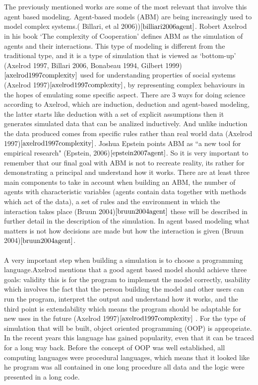 \documentclass{article}
\begin{document}
\\\\The previously mentioned works are some of the most relevant that involve this agent based modeling. Agent-based models (ABM) are being increasingly used to model complex systems.( Billari, et al 2006))$\cite{billiari2006agent}$. Robert Axelrod in his book `The complexity of Cooperation’ defines ABM as the simulation of agents and their interactions. This type of modeling is different from the traditional type, and it is a type of simulation that is viewed as `bottom-up’ (Axelrod 1997, Billari 2006, Bonabeau 1994, Gilbert 1999)$\cite{axelrod1997complexity}$ used for understanding properties of social systems (Axelrod 1997)$\cite{axelrod1997complexity}$, by representing complex behaviours in the hopes of emulating some specific aspect. There are 3 ways for doing science according to Axelrod, which are induction, deduction and agent-based modeling, the latter starts like deduction with a set of explicit assumptions then it generates simulated data that can be analized inductively. And unlike induction the data produced comes from specific rules rather than real world data (Axelrod 1997)$\cite{axelrod1997complexity}$. Joshua Epstein points ABM as ``a new tool for empirical research" (Epstein, 2006)$\cite{epstein2007agent}$. So it is very important to remember that our final goal with ABM is not to recreate reality, its rather for demonstrating a principal and understand how it works. 
There are at least three main components to take in account when building an ABM, the number of agents with characteristic variables (agents contain data together with methods which act of the data), a set of rules and the environment in which the interaction takes place (Bruun 2004)$\cite{bruun2004agent}$ these will be described in further detail in the description of the simulation. In agent based modeling what matters is not how decisions are made but how the interaction is given (Bruun 2004)$\cite{bruun2004agent}$. 
\\\\A very important step when building a simulation is to choose a programming language.Axelrod mentions that a good agent based model should achieve three goals: validity this is for the program to implement the model correctly, usability which involves the fact that the person building the model and other users can run the program, interpret the output and understand how it works, and the third point is extendability which means the program should be adaptable for new uses in the future (Axelrod 1997)$\cite{axelrod1997complexity}$ . For the type of simulation that will be built, object oriented programming (OOP) is appropriate. In the recent years this language has gained popularity, even that it can be traced for a long way back. Before the concept of OOP was well established, all computing languages were procedural languages, which means that it looked like he program was all contained in one long procedure all data and the logic were presented in a long code.
\end{document}
